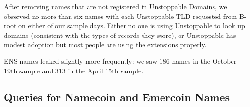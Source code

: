 	
	
After removing names that are not registered in Unstoppable Domains, we 
observed no more than six names with each Unstoppable TLD requested from B-root 
on either of our sample days. Either no one is using Unstoppable to look up 
domains (consistent with the types of records they store), or Unstoppable has 
modest adoption but most people are using the extensions properly.

ENS names leaked slightly more frequently: we saw 186 names in the October 19th
sample and 313 in the April 15th sample.

\subsection{Queries for Namecoin and Emercoin Names}

